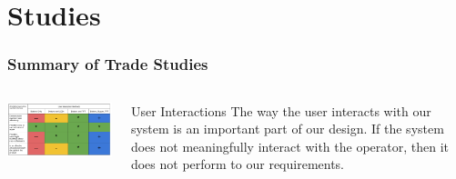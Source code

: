 \documentclass[aspectratio=169]{beamer}
\begin{document}
\section{Studies}
\begin{frame}
    \frametitle{Summary of Trade Studies}

    \begin{columns}
        \begin{column}{0.70\textwidth}
            \includegraphics[width=10.5cm]{UserInteractionTradeStudy}
        \end{column}

        \begin{column}{0.28\textwidth}
            \begin{block}{User Interactions}
                The way the user interacts with our system is an important
                part of our design. If the system does not meaningfully
                interact with the operator, then it does not perform
                to our requirements.
            \end{block}
        \end{column}
    \end{columns}

\end{frame}
\end{document}
